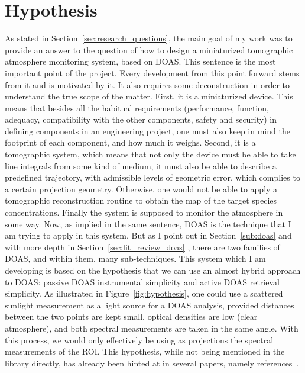 \section{Hypothesis}%
\label{sec:hypothesis}

As stated in Section~\ref{sec:research_questions}, the main goal of my
work was to provide an answer to the question of how to design a
miniaturized tomographic atmosphere monitoring system, based on
\gls{DOAS}.  This sentence is the most important point of the project.
Every development from this point forward stems from it and is motivated
by it. It also requires some deconstruction in order to understand the
true scope of the matter. First, it is a miniaturized device. This means
that besides all the habitual requirements (performance, function,
adequacy, compatibility with the other components, safety and security)
in defining components in an engineering project, one must also keep in
mind the footprint of each component, and how much it weighs. Second, it
is a tomographic system, which means that not only the device must be
able to take line integrals from some kind of medium, it must also be
able to describe a predefined trajectory, with admissible levels of
geometric error, which complies to a certain projection geometry.
Otherwise, one would not be able to apply a tomographic reconstruction
routine to obtain the map of the target species concentrations. Finally
the system is supposed to monitor the atmosphere in some way. Now, as
implied in the same sentence, \gls{DOAS} is the technique that I am
trying to apply in this system. But as I point out in
Section~\ref{sub:doas} and with more depth in
Section~\ref{sec:lit_review_doas} , there are two families of
\gls{DOAS}, and within them, many sub-techniques. This system which I am
developing is based on the hypothesis that we can use an almost hybrid
approach to \gls{DOAS}: passive \gls{DOAS} instrumental simplicity and
active \gls{DOAS} retrieval simplicity. As illustrated in
Figure~\ref{fig:hypothesis}, one could use a scattered sunlight
measurement as a light source for a \gls{DOAS} analysis, provided
distances between the two points are kept small, optical densities are
low (clear atmosphere), and both spectral measurements are taken in the
same angle. With this process, we would only effectively be using as
projections the spectral measurements of the \gls{ROI}. This hypothesis,
while not being mentioned in the library directly, has already been
hinted at in several papers, namely references~\cite{Frins2006,
Casaballe2017, Johansson2009}.

